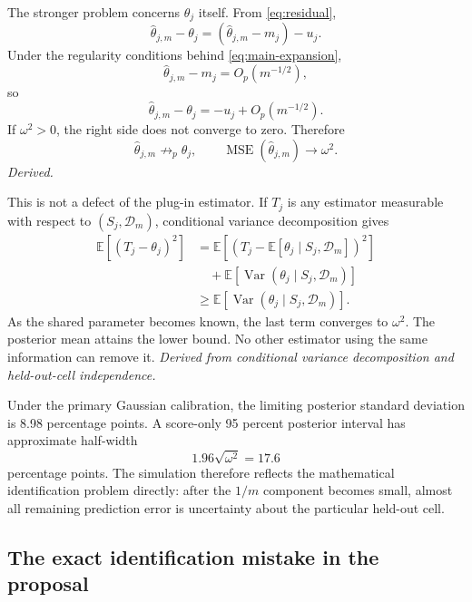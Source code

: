 \documentclass[11pt]{article}
\newcommand{\E}{\mathbb E}
\newcommand{\Var}{\operatorname{Var}}
\newcommand{\MSE}{\operatorname{MSE}}
\begin{document}
The stronger problem concerns \(\theta_j\) itself. From
\eqref{eq:residual},
\begin{equation}
 \widehat\theta_{j,m}-\theta_j
 =(\widehat\theta_{j,m}-m_j)-u_j.
 \label{eq:individual-error}
\end{equation}
Under the regularity conditions behind \eqref{eq:main-expansion},
\begin{equation}
 \widehat\theta_{j,m}-m_j=O_p(m^{-1/2}),
\end{equation}
so
\begin{equation}
 \widehat\theta_{j,m}-\theta_j
 =-u_j+O_p(m^{-1/2}).
 \label{eq:nonconvergence}
\end{equation}
If \(\omega^2>0\), the right side does not converge to zero. Therefore
\begin{equation}
 \widehat\theta_{j,m}\not\longrightarrow_p\theta_j,
 \qquad
 \MSE(\widehat\theta_{j,m})\longrightarrow\omega^2.
 \label{eq:not-consistent}
\end{equation}
\emph{Derived.}

This is not a defect of the plug-in estimator. If \(T_j\) is any estimator
measurable with respect to \((S_j,\mathcal D_m)\), conditional variance
decomposition gives
\begin{align}
 \E[(T_j-\theta_j)^2]
 &=\E[(T_j-\E[\theta_j\mid S_j,\mathcal D_m])^2] \\
 &\quad+\E[\Var(\theta_j\mid S_j,\mathcal D_m)] \\
 &\geq\E[\Var(\theta_j\mid S_j,\mathcal D_m)].
 \label{eq:bayes-lower-bound}
\end{align}
As the shared parameter becomes known, the last term converges to
\(\omega^2\). The posterior mean attains the lower bound. No other estimator
using the same information can remove it. \emph{Derived from conditional
variance decomposition and held-out-cell independence.}

Under the primary Gaussian calibration, the limiting posterior standard
deviation is 8.98 percentage points. A score-only 95 percent posterior
interval has approximate half-width
\begin{equation}
 1.96\sqrt{\omega^2}=17.6
 \label{eq:interval-width}
\end{equation}
percentage points. The simulation therefore reflects the mathematical
identification problem directly: after the \(1/m\) component becomes small,
almost all remaining prediction error is uncertainty about the particular
held-out cell.

\subsection*{The exact identification mistake in the proposal}
\end{document}
